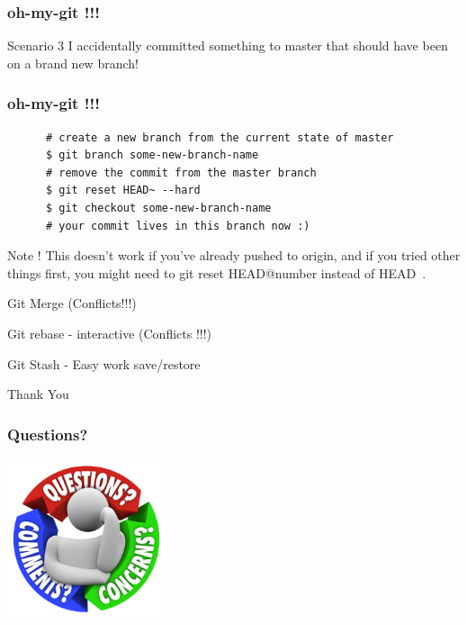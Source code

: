 \documentclass[10pt]{beamer}
\begin{document}
\begin{frame}
  \frametitle{oh-my-git !!!}
  \begin{alertblock}{Scenario 3}
   I accidentally committed something to master that should have been on a brand new branch!
  \end{alertblock}
\end{frame}

\begin{frame}[fragile]
  \frametitle{oh-my-git !!!}
  \begin{example}[Solution]
    \begin{verbatim}
      # create a new branch from the current state of master
      $ git branch some-new-branch-name
      # remove the commit from the master branch
      $ git reset HEAD~ --hard
      $ git checkout some-new-branch-name
      # your commit lives in this branch now :)
    \end{verbatim}
  \end{example}
  \pause
  \begin{block}{Note !}
    This doesn't work if you've already pushed to origin, and if you tried other things first,
    you might need to git reset HEAD@{number} instead of HEAD~.
  \end{block}
\end{frame}

\begin{frame}
  \begin{center}
    \Huge{Git Merge (Conflicts!!!)}
  \end{center}
\end{frame}

\begin{frame}
  \begin{center}
    \Huge{Git rebase - interactive (Conflicts !!!)}
  \end{center}
\end{frame}

\begin{frame}
  \begin{center}
    \Huge{Git Stash - Easy work save/restore }
  \end{center}
\end{frame}

\begin{frame}
  \begin{center}
    \Huge{Thank You}
  \end{center}
\end{frame}

\begin{frame}
	\frametitle{Questions?}
	\begin{center}
	\includegraphics[width=0.35\textwidth]{q5.jpg}
	\end{center}
\end{frame}

\end{document}
